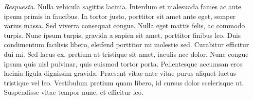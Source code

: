 \documentclass[11pt]{article}
\theoremstyle{ejercicio-style}
\begin{document}


\emph{Respuesta.} Nulla vehicula sagittis lacinia. Interdum et malesuada fames ac ante ipsum primis in faucibus. In tortor justo, porttitor sit amet ante eget, semper varius massa. Sed viverra consequat congue. Nulla eget mattis felis, ac commodo turpis. Nunc ipsum turpis, gravida a sapien sit amet, porttitor finibus leo. Duis condimentum facilisis libero, eleifend porttitor mi molestie sed. Curabitur efficitur dui mi. Sed lacus ex, pretium at tristique sit amet, iaculis nec dolor. Nunc congue ipsum quis nisl pulvinar, quis euismod tortor porta. Pellentesque accumsan eros lacinia ligula dignissim gravida. Praesent vitae ante vitae purus aliquet luctus tristique vel leo. Vestibulum pretium quam libero, id cursus dolor scelerisque ut. Suspendisse vitae tempor nunc, et efficitur leo.\\
\end{document}
